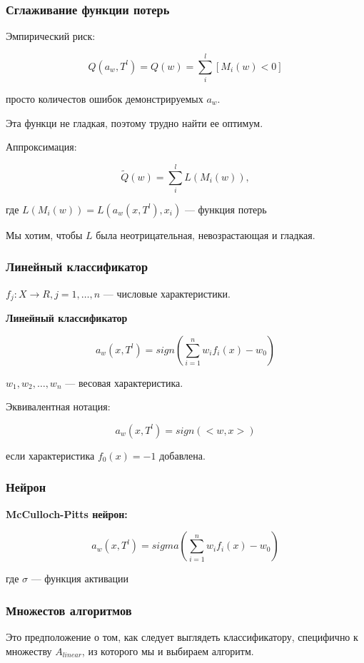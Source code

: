 \documentclass[10pt,a4paper,oneside,titlepage]{report}
\theoremstyle{defenition}
\theoremstyle{theorem}
\begin{document}
\subsubsection{Сглаживание функции потерь}

Эмпирический риск:

$$
Q(a_w, T^l) = Q(w) = \sum_i^l [M_i(w) < 0]
$$

просто количестов ошибок демонстрируемых $a_w$.

Эта функци не гладкая, поэтому трудно найти ее оптимум. 

Аппроксимация:

$$
\tilde{Q}(w) = \sum_i^l L(M_i(w)),
$$

где $L(M_i(w)) = L(a_w(x, T^l), x_i)$ --- функция потерь

Мы хотим, чтобы $L$ была неотрицательная, невозрастающая и гладкая.

\subsubsection{Линейный классификатор}

$f_j: X\rightarrow R, j = 1, \ldots, n$ --- числовые характеристики.

{\bfseries Линейный классификатор}

$$
a_w(x, T^l) = sign(\sum_{i=1}^n w_if_i(x) - w_0)
$$

$w_1, w_2, \ldots, w_n$ --- весовая характеристика.

Эквивалентная нотация:

$$
a_w(x, T^l) = sign(<w, x>)
$$

если характеристика $f_0(x) = -1$ добавлена.

\subsubsection{Нейрон}

{\bfseries McCulloch-Pitts нейрон:}

$$
a_w(x, T^l) = sigma ( \sum_{i=1}^n w_i f_i(x) - w_0)
$$

где $\sigma$ --- функция активации

\subsubsection{Множестов алгоритмов}

Это предположение о том, как следует выглядеть классификатору, специфично к множеству $A_{linear}$, из которого мы и выбираем алгоритм.
\end{document}
